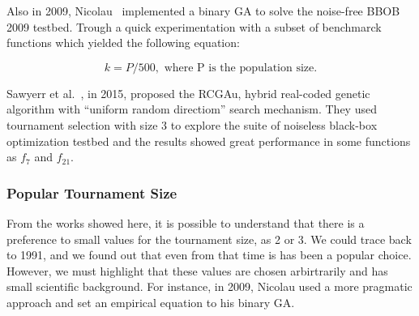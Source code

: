 Also in 2009, Nicolau~\cite{nicolau2009application} implemented a binary GA to solve the noise-free BBOB 2009 testbed. Trough a quick experimentation with a subset of benchmarck functions which yielded the following equation:

\begin{equation}
	k = P/500, \text{ where P is the population size.}
\end{equation}


Sawyerr et al.~\cite{sawyerr2015benchmarking}, in 2015, proposed the RCGAu, hybrid real-coded genetic algorithm with ``uniform random directiom'' search mechanism. They used tournament selection with size 3 to explore the suite of noiseless black-box optimization testbed and the results showed great performance in some functions as $f_7$ and $f_{21}$.

\subsubsection{Popular Tournament Size}\label{sec:background:pop_tournament_size} 

From the works showed here, it is possible to understand that there is a preference to small values for the tournament size, as 2 or 3. We could trace back to 1991, and we found out that even from that time is has been a popular choice. However, we must highlight that these values are chosen arbirtrarily and has small scientific background. For instance, in 2009, Nicolau used a more pragmatic approach and set an empirical equation to his binary GA. 




